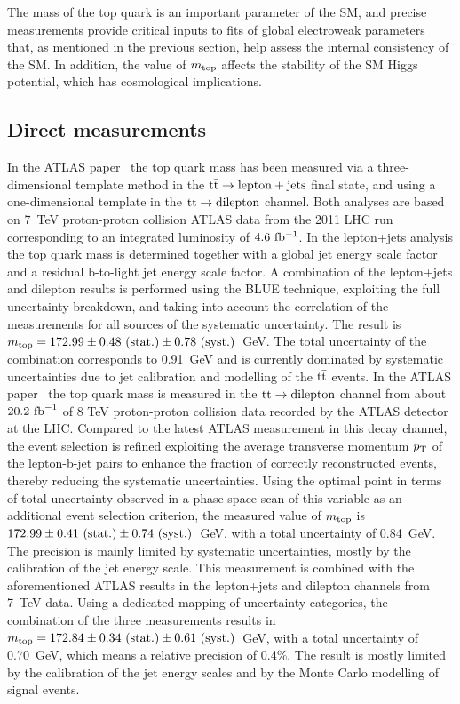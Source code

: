 \documentclass{blois}
\begin{document}
The mass of the top quark is an important parameter of the SM, and precise
measurements provide critical inputs to fits of global electroweak parameters
that, as mentioned in the previous section, help assess the internal consistency
of the SM. In addition, the value of $m_{\rm top}$ affects the stability of the
SM Higgs potential, which has cosmological implications.


\subsection{Direct measurements}

In the ATLAS paper~\cite{ref:ATLAS-topMass7TeV} the top quark mass has been
measured via a three-dimensional template method in the ${\rm t{\bar t}\to \rm lepton+jets}$
final state, and using a one-dimensional template in the ${\rm t{\bar t}\to dilepton}$
channel. Both analyses are based on 7~TeV proton-proton collision ATLAS data from
the 2011 LHC run corresponding to an integrated luminosity of $4.6~{\rm fb^{-1}}$.
In the lepton+jets analysis the top quark mass is determined together with a global
jet energy scale factor and a residual b-to-light jet energy scale factor. A
combination of the lepton+jets and dilepton results is performed using the BLUE
technique, exploiting the full uncertainty breakdown, and taking into account the
correlation of the measurements for all sources of the systematic uncertainty.
The result is $m_{\rm top} = 172.99 \pm 0.48~({\rm stat.}) \pm 0.78~({\rm syst.})$~GeV.
The total uncertainty of the combination corresponds to 0.91~GeV and is currently
dominated by systematic uncertainties due to jet calibration and modelling of the
${\rm t{\bar t}}$ events. In the ATLAS paper~\cite{ref:ATLAS-topMassDilepton8TeV}
the top quark mass is measured in the ${\rm t{\bar t}\to dilepton}$ channel from
about $20.2~{\rm fb}^{-1}$ of 8 TeV proton-proton collision data recorded by the
ATLAS detector at the LHC. Compared to the latest ATLAS measurement in this decay
channel, the event selection is refined exploiting the average transverse
momentum $p_{\rm T}$ of the lepton-b-jet pairs to enhance the fraction of
correctly reconstructed events, thereby reducing the systematic uncertainties.
Using the optimal point in terms of total uncertainty observed in a phase-space
scan of this variable as an additional event selection criterion, the measured
value of $m_{\rm top}$ is $172.99\pm 0.41~({\rm stat.})\pm 0.74~({\rm syst.})$~GeV,
with a total uncertainty of 0.84~GeV. The precision is mainly limited by systematic
uncertainties, mostly by the calibration of the jet energy scale. This measurement
is combined with the aforementioned ATLAS results in the lepton+jets and dilepton
channels from 7~TeV data. Using a dedicated mapping of uncertainty categories, the
combination of the three measurements results in
$m_{\rm top} = 172.84 \pm 0.34~({\rm stat.}) \pm 0.61~({\rm syst.})$~GeV, with a
total uncertainty of 0.70~GeV, which means a relative precision of 0.4\%. The
result is mostly limited by the calibration of the jet energy scales and by the
Monte Carlo modelling of signal events.
\end{document}
